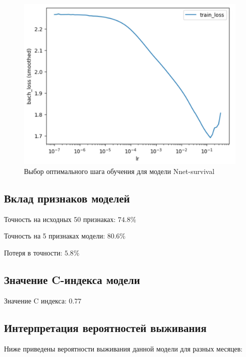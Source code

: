 \documentclass[a4paper,14pt,oneside,openany]{memoir}
\begin{document}
\begin{figure}[H]
	\includegraphics[width=\textwidth]{../figures/nnet_losses_30_epoch_lr.png}
	\caption{Выбор оптимального шага обучения для модели Nnet-survival}
\end{figure}

\subsection{Вклад признаков моделей}

Точность на исходных 50 признаках: $74.8\%$

Точность на 5 признаках модели: $80.6\%$

Потеря в точности: $5.8\%$

\subsection{Значение C-индекса модели}

Значение C индекса: $0.77$

\subsection{Интерпретация вероятностей выживания}

Ниже приведены вероятности выживания данной модели для разных месяцев: 
\end{document}
